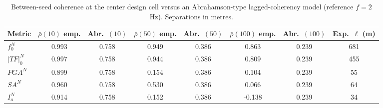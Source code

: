 \begin{table}[!ht]
\caption{Between-seed coherence at the center design cell versus an Abrahamson-type lagged-coherency model (reference $f=2$ Hz). Separations in metres.\label{tab:literature_coherence}}
\begin{tabular*}{\textwidth}{@{\extracolsep{\fill}}lccccccc@{}}
\toprule
Metric & $\bar\rho(10)$ emp. & Abr.\ $(10)$ & $\bar\rho(50)$ emp. & Abr.\ $(50)$ & $\bar\rho(100)$ emp. & Abr.\ $(100)$ & Exp.\ $\ell$ (m) \\
\midrule
$f_0^N$ & 0.993 & 0.758 & 0.949 & 0.386 & 0.863 & 0.239 & 681 \\
$\lvert TF\rvert_0^N$ & 0.997 & 0.758 & 0.944 & 0.386 & 0.809 & 0.239 & 455 \\
$PGA^N$ & 0.899 & 0.758 & 0.154 & 0.386 & 0.104 & 0.239 & 55 \\
$SA^N$ & 0.960 & 0.758 & 0.530 & 0.386 & 0.066 & 0.239 & 64 \\
$I_a^N$ & 0.914 & 0.758 & 0.152 & 0.386 & -0.138 & 0.239 & 34 \\
\bottomrule
\end{tabular*}
\end{table}
